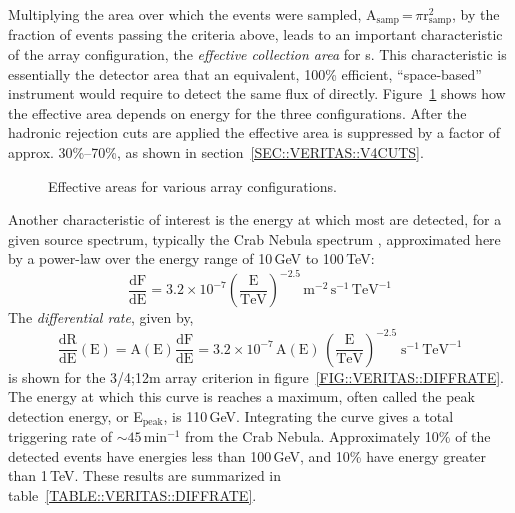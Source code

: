 Multiplying the area over which the events were sampled,
A$_\mathrm{samp}$\,=\,$\pi$r$_\mathrm{samp}^2$, by the fraction of
events passing the criteria above, leads to an important
characteristic of the array configuration, the \textit{effective
collection area} for {\Grayc}s. This characteristic is essentially the
detector area that an equivalent, 100\% efficient, ``space-based''
instrument would require to detect the same flux of \Grays
directly. Figure~\ref{FIG::VERITAS::EFFAREA} shows how the effective
area depends on energy for the three configurations. After the
hadronic rejection cuts are applied the effective area is suppressed
by a factor of approx. 30\%--70\%, as shown in
section~\ref{SEC::VERITAS::V4CUTS}.

\begin{figure}[p]
\begin{minipage}{\textwidth}
\hspace*{\fill}
\hspace*{\fill}
\end{minipage}
\caption{\label{FIG::VERITAS::EFFAREA} Effective areas for various array
configurations.}
\end{figure}

Another characteristic of interest is the energy at which most \Grays
are detected, for a given \Gray source spectrum, typically the Crab
Nebula spectrum \citep{REF::HILLAS::1998}, approximated here by a
power-law over the energy range of 10\,GeV to 100\,TeV:
\[\mathrm{\frac{dF}{dE}=3.2\times10^{-7}\left(\frac{E}{TeV}\right)^{-2.5}\,
m^{-2}\,s^{-1}\,TeV^{-1}}\] 
The \textit{differential rate}, given by,
\[\mathrm{\frac{dR}{dE}(E) = A(E)\frac{dF}{dE} = 3.2\times10^{-7}\,A(E)\,
\left(\frac{E}{TeV}\right)^{-2.5}\;s^{-1}\,TeV^{-1}}\]
is shown for the 3/4;12m array criterion in
figure~\ref{FIG::VERITAS::DIFFRATE}. The energy at which this curve is
reaches a maximum, often called the peak detection energy, or
E$_\mathrm{peak}$, is 110\,GeV. Integrating the curve gives a total
triggering rate of $\sim45$\,min$^{-1}$ from the Crab
Nebula. Approximately 10\% of the detected events have energies less
than 100\,GeV, and 10\% have energy greater than 1\,TeV. These results
are summarized in table~\ref{TABLE::VERITAS::DIFFRATE}.

